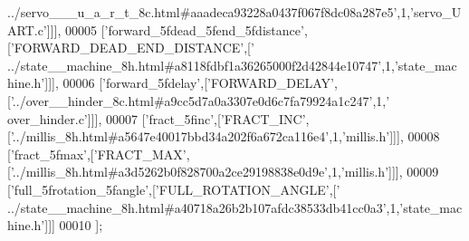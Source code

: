 \begin{DoxyCode}
{      ../servo\_\_\_u\_a\_r\_t\_8c.html#aaadeca93228a0437f067f8dc08a287e5'},1,\textcolor{stringliteral}{'servo\_UART.c'}]]],
00005   [\textcolor{stringliteral}{'forward\_5fdead\_5fend\_5fdistance'},[\textcolor{stringliteral}{'FORWARD\_DEAD\_END\_DISTANCE'},[\textcolor{stringliteral}{'
      ../state\_\_machine\_8h.html#a8118fdbf1a36265000f2d42844e10747'},1,\textcolor{stringliteral}{'state\_machine.h'}]]],
00006   [\textcolor{stringliteral}{'forward\_5fdelay'},[\textcolor{stringliteral}{'FORWARD\_DELAY'},[\textcolor{stringliteral}{'../over\_\_hinder\_8c.html#a9cc5d7a0a3307e0d6c7fa79924a1c247'},1,\textcolor{stringliteral}{'
      over\_hinder.c'}]]],
00007   [\textcolor{stringliteral}{'fract\_5finc'},[\textcolor{stringliteral}{'FRACT\_INC'},[\textcolor{stringliteral}{'../millis\_8h.html#a5647e40017bbd34a202f6a672ca116e4'},1,\textcolor{stringliteral}{'millis.h'}]]],
00008   [\textcolor{stringliteral}{'fract\_5fmax'},[\textcolor{stringliteral}{'FRACT\_MAX'},[\textcolor{stringliteral}{'../millis\_8h.html#a3d5262b0f828700a2ce29198838e0d9e'},1,\textcolor{stringliteral}{'millis.h'}]]],
00009   [\textcolor{stringliteral}{'full\_5frotation\_5fangle'},[\textcolor{stringliteral}{'FULL\_ROTATION\_ANGLE'},[\textcolor{stringliteral}{'
      ../state\_\_machine\_8h.html#a40718a26b2b107afdc38533db41cc0a3'},1,\textcolor{stringliteral}{'state\_machine.h'}]]]
00010 ];
\end{DoxyCode}
